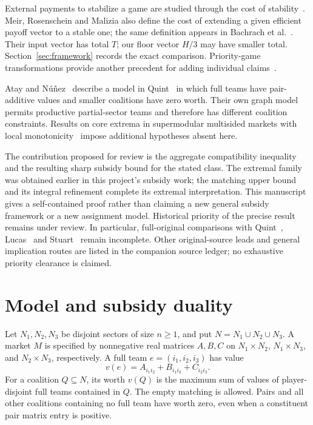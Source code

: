 \documentclass[11pt]{article}
\theoremstyle{remark}
\begin{document}
External payments to stabilize a game are studied through the cost of
stability~\cite{Bachrach2009,Bachrach2018}. Meir, Rosenschein and Malizia
\cite[Section~2.2]{Meir2011} also define the cost of extending a given
efficient payoff vector to a stable one; the same definition appears in
Bachrach et al.~\cite[Section~5]{Bachrach2018}. Their input vector has total $T$;
our floor vector $H/3$ may have smaller total. Section~\ref{sec:framework}
records the exact comparison. Priority-game transformations provide another
precedent for adding individual claims~\cite{Priority2024}.

Atay and N\'u\~nez~\cite[p.~273]{AtayNunez2019} describe a model in
Quint~\cite{Quint1991} in which full teams have pair-additive values and
smaller coalitions have zero worth. Their own graph model permits productive
partial-sector teams and therefore has different coalition constraints.
Results on core extrema in supermodular multisided markets with local
monotonicity~\cite{Martinez2026} impose additional hypotheses absent here.

The contribution proposed for review is the aggregate compatibility
inequality and the resulting sharp subsidy bound for the stated class.
The extremal family was obtained earlier in this project's subsidy work;
the matching upper bound and its integral refinement complete its extremal
interpretation. This manuscript gives a self-contained proof rather than
claiming a new general subsidy framework or a new assignment model.
Historical priority of the precise result remains under review. In
particular, full-original comparisons with Quint~\cite{Quint1991},
Lucas~\cite{Lucas1995} and Stuart~\cite{Stuart1997} remain incomplete.
Other original-source leads and general implication routes are listed in
the companion source ledger; no exhaustive priority clearance is claimed.

\section{Model and subsidy duality}\label{sec:model}
Let $N_1,N_2,N_3$ be disjoint sectors of size $n\ge1$, and put
$N=N_1\cup N_2\cup N_3$. A market $M$ is specified by nonnegative real
matrices $A,B,C$ on $N_1\times N_2$, $N_1\times N_3$, and
$N_2\times N_3$, respectively. A full team $e=(i_1,i_2,i_3)$ has value
\begin{equation}\label{eq:team}
                  v(e)=A_{i_1i_2}+B_{i_1i_3}+C_{i_2i_3}.
\end{equation}
For a coalition $Q\subseteq N$, its worth $v(Q)$ is the maximum sum of
values of player-disjoint full teams contained in $Q$. The empty matching
is allowed. Pairs and all other coalitions containing no full team have
worth zero, even when a constituent pair matrix entry is positive.
\end{document}
